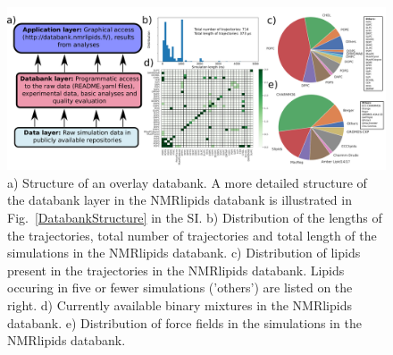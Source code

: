 \documentclass[fleqn,10pt]{wlscirep}
\begin{document}
\begin{figure}
    \centering
    \includegraphics[width=\linewidth]{Figures/overlay2.pdf}
    \caption{a) Structure of an overlay databank. 
    A more detailed structure of the databank layer in the NMRlipids databank is illustrated in Fig.~\ref{DatabankStructure} in the SI.
    b) Distribution of the lengths of the trajectories, total number of trajectories and total length of the simulations in the NMRlipids databank.
    c) Distribution of lipids present in the trajectories in the NMRlipids databank. Lipids occuring in five or fewer simulations ('others') are listed on the right. 
    d) Currently available binary mixtures in the NMRlipids databank. 
    e) Distribution of force fields in the simulations in the NMRlipids databank.
    }
    \label{fig:overlay}
\end{figure}
\end{document}
